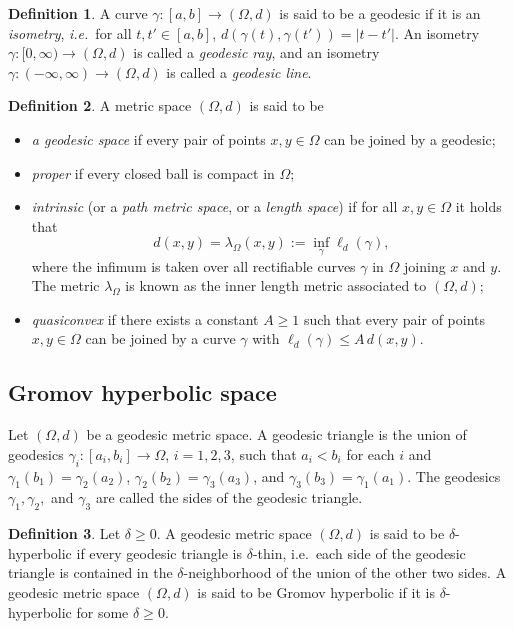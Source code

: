 \documentclass[a4paper,12pt]{amsart}
\theoremstyle{definition}
\newtheorem{defn}{Definition}[section]
\newcounter {own}
\begin{document}
\begin{defn}
	A curve $\gamma:[a,b]\to (\Omega,d)$ is said to be a geodesic if it is an {\it isometry}, {\it i.e.}\ for all $t,t'\in [a,b]$,
	$d(\gamma(t), \gamma(t'))=|t-t'|$.
	An isometry $\gamma:[0,\infty)\to (\Omega,d)$ is called a {\it geodesic ray}, and an isometry $\gamma:(-\infty,\infty)\to (\Omega,d)$ is called a {\it geodesic line}.
\end{defn}

\begin{defn}\label{metric definition}
	A metric space $(\Omega,d)$ is said to be
	\begin{itemize}
		\item[(1)] {\it a geodesic space} if every pair of points $x,y \in \Omega$ can be joined by a geodesic;
		\item[(2)] {\it proper} if every closed ball is compact in $\Omega$;
		\item[(3)] {\it intrinsic} (or a {\it path metric space}, or a {\it length space}) if for all $x,y\in \Omega$ it holds that
		$$d(x,y)=\lambda_\Omega(x,y):=\inf_{\gamma} \ell_d(\gamma),$$
		where the infimum is taken over all rectifiable curves $\gamma$ in $\Omega$ joining $x$ and $y$. The metric $\lambda_\Omega$ is known as the inner length metric associated to $(\Omega,d)$;
		\item[(4)] {\it quasiconvex} if there exists a constant $A\ge 1$ such that every pair of points $x,y\in \Omega$ can be joined by a curve $\gamma$ with $\ell_d(\gamma)\le A\,d(x,y)$.
	\end{itemize}
\end{defn}

\subsection{Gromov hyperbolic space}\label{GHS}
Let $(\Omega,d)$ be a geodesic metric space. A geodesic triangle is the union of geodesics $\gamma_i:[a_i,b_i]\to \Omega$, $i=1,2,3$, such that $a_i<b_i$ for each $i$ and
$\gamma_1(b_1)=\gamma_2(a_2)$, $\gamma_2(b_2)=\gamma_3(a_3)$, and $\gamma_3(b_3)=\gamma_1(a_1)$.
The geodesics $\gamma_1,\gamma_2,$ and $\gamma_3$ are called the sides of the geodesic triangle.

\begin{defn}
	Let $\delta\ge 0$. A geodesic metric space $(\Omega,d)$ is said to be $\delta$-hyperbolic if every geodesic triangle is $\delta$-thin, i.e.\ each side of the geodesic triangle is contained in the $\delta$-neighborhood of the union of the other two sides. A geodesic metric space $(\Omega,d)$ is said to be Gromov hyperbolic if it is $\delta$-hyperbolic for some $\delta\ge 0$.
\end{defn}
\end{document}
